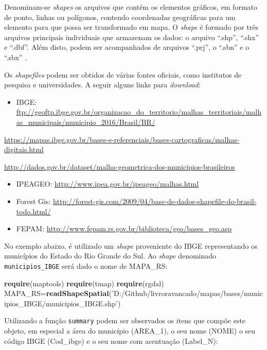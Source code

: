 \documentclass[12pt,brazil,]{book}
\newenvironment{Shaded}{\begin{snugshade}}{\end{snugshade}}
\newcommand{\KeywordTok}[1]{\textcolor[rgb]{0.13,0.29,0.53}{\textbf{#1}}}
\newcommand{\NormalTok}[1]{#1}
\newcommand{\StringTok}[1]{\textcolor[rgb]{0.31,0.60,0.02}{#1}}
\providecommand{\tightlist}{%
  \setlength{\itemsep}{0pt}\setlength{\parskip}{0pt}}
\begin{document}
Denominam-se \emph{shapes} os arquivos que contém os elementos gráficos,
em formato de ponto, linhas ou polígonos, contendo coordenadas
geográficas para um elemento para que possa ser transformado em mapa. O
\emph{shape} é formado por três arquivos principais individuais que
armazenam os dados: o arquivo ``.shp'', ``.shx'' e ``.dbf''. Além disto,
podem ser acompanhados de arquivos ``.prj'', o ``.sbn'' e o ``.sbx''
\autocite{Semace2018}.

Os \emph{shapefiles} podem ser obtidos de várias fontes oficiais, como
institutos de pesquisa e universidades. A seguir alguns links para
\emph{download}:

\begin{itemize}
\tightlist
\item
  IBGE:
  \url{ftp://geoftp.ibge.gov.br/organizacao_do_territorio/malhas_territoriais/malhas_municipais/municipio_2016/Brasil/BR/}
\end{itemize}

\url{https://mapas.ibge.gov.br/bases-e-referenciais/bases-cartograficas/malhas-digitais.html}

\url{http://dados.gov.br/dataset/malha-geometrica-dos-municipios-brasileiros}

\begin{itemize}
\item
  IPEAGEO: \url{http://www.ipea.gov.br/ipeageo/malhas.html}
\item
  Forest Gis:
  \url{http://forest-gis.com/2009/04/base-de-dados-shapefile-do-brasil-todo.html/}
\item
  FEPAM: \url{http://www.fepam.rs.gov.br/biblioteca/geo/bases_geo.asp}
\end{itemize}

No exemplo abaixo, é utilizado um \emph{shape} proveniente do IBGE
representando os municípios do Estado do Rio Grande do Sul. Ao
\emph{shape} denominado \texttt{municipios\_IBGE} será dado o nome de
MAPA\_RS:

\begin{Shaded}
\begin{Highlighting}[]
\KeywordTok{require}\NormalTok{(maptools)}
\KeywordTok{require}\NormalTok{(tmap)}
\KeywordTok{require}\NormalTok{(rgdal)}
\NormalTok{MAPA_RS=}\KeywordTok{readShapeSpatial}\NormalTok{(}\StringTok{'D:/Github/livroravancado/mapas/bases/municipios_IBGE/municipios_IBGE.shp'}\NormalTok{)}
\end{Highlighting}
\end{Shaded}

Utilizando a função \texttt{summary} podem ser observados os itens que
compõe este objeto, em especial a área do município (AREA\_1), o seu
nome (NOME) o seu código IBGE (Cod\_ibge) e o seu nome com acentuação
(Label\_N):
\end{document}
